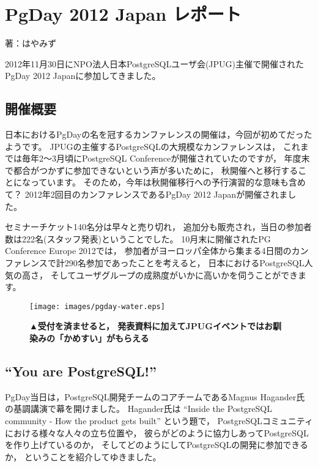 
\chapter{PgDay 2012 Japan レポート}

\begin{flushright}
 {\headfont 著：はやみず}
\end{flushright}

2012年11月30日にNPO法人日本PostgreSQLユーザ会(JPUG)主催で開催されたPgDay 2012 Japanに参加してきました。

\section{開催概要}

日本におけるPgDayの名を冠するカンファレンスの開催は，今回が初めてだったようです。
JPUGの主催するPostgreSQLの大規模なカンファレンスは，
これまでは毎年2〜3月頃にPostgreSQL Conferenceが開催されていたのですが，
年度末で都合がつかずに参加できないという声が多いために，
秋開催へと移行することになっています。
そのため，今年は秋開催移行への予行演習的な意味も含めて？
2012年2回目のカンファレンスであるPgDay 2012 Japanが開催されました。

セミナーチケット140名分は早々と売り切れ，
追加分も販売され，当日の参加者数は222名(スタッフ発表)ということでした。
10月末に開催されたPG Conference Europe 2012では，
参加者がヨーロッパ全体から集まる4日間のカンファレンスで計290名参加であったことを考えると，
日本におけるPostgreSQL人気の高さ，
そしてユーザグループの成熟度がいかに高いかを伺うことができます。

\begin{figure}[tb]
 \begin{center}
  \texttt{[image: images/pgday-water.eps]}\par
  \noindent 
{\bf ▲受付を済ませると，
  発表資料に加えてJPUGイベントではお馴染みの「かめすい」がもらえる}
 \end{center}
\end{figure}

\section{``You are PostgreSQL!''}

PgDay当日は，PostgreSQL開発チームのコアチームであるMagnus Hagander氏の基調講演で幕を開けました。
Hagander氏は ``Inside the PostgreSQL community - How the product gets built'' という題で，
PostgreSQLコミュニティにおける様々な人々の立ち位置や，
彼らがどのように協力しあってPostgreSQLを作り上げているのか，
そしてどのようにしてPostgreSQLの開発に参加できるか，
ということを紹介してゆきました。

